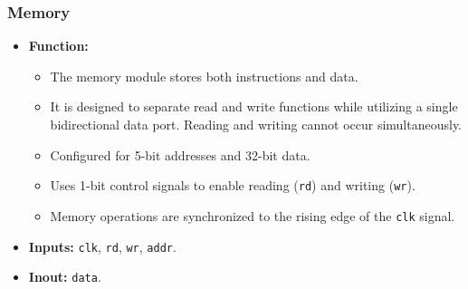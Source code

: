 \subsubsection*{Memory}
\begin{itemize}
	\item \textbf{Function:}
	      \begin{itemize}
		      \item The memory module stores both instructions and data.
		      \item It is designed to separate read and write functions while utilizing a single bidirectional data port. Reading and writing cannot occur simultaneously.
		      \item Configured for 5-bit addresses and 32-bit data.
		      \item Uses 1-bit control signals to enable reading (\texttt{rd}) and writing (\texttt{wr}).
		      \item Memory operations are synchronized to the rising edge of the \texttt{clk} signal.
	      \end{itemize}
	\item \textbf{Inputs:} \texttt{clk}, \texttt{rd}, \texttt{wr}, \texttt{addr}.
	\item \textbf{Inout:} \texttt{data}.
\end{itemize}
